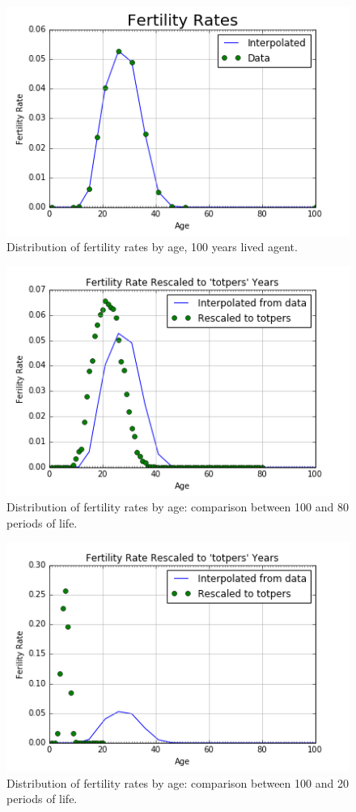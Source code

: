 \documentclass[letterpaper,12pt]{article}
\theoremstyle{definition}
\begin{document}
\begin{figure}[h!]
\centering
\includegraphics[scale=.8]{code/images/fert_rate}
\caption{Distribution of fertility rates by age, 100 years lived agent.}
\end{figure}

\begin{figure}[h!]
\centering
\includegraphics[scale=.8]{code/images/fert_totpers80}
\caption{Distribution of fertility rates by age: comparison between 100 and 80 periods of life.}
\end{figure}

\begin{figure}[h!]
\centering
\includegraphics[scale=.8]{code/images/fert_totpers20}
\caption{Distribution of fertility rates by age: comparison between 100 and 20 periods of life.}
\end{figure}
\end{document}
